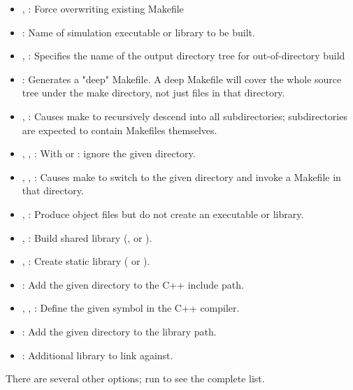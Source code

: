 \begin{itemize}
    \item {},  : Force overwriting existing Makefile
    \item {} : Name of simulation executable or library to be built.
    \item {},  :
                          Specifies the name of the output directory tree for out-of-directory build
    \item {} : Generates a "deep" Makefile. A deep Makefile will
                          cover the whole source tree under the make directory,
                          not just files in that directory.
    \item {},  : Causes make to recursively descend into all subdirectories;
                          subdirectories are expected to contain Makefiles themselves.
    \item {}, ,  :
                          With  or : ignore the given directory.
    \item {}, ,  :
                          Causes make to switch to the given directory and invoke
                          a Makefile in that directory.
    \item {},  : Produce object files but do not create an executable or library.
    \item {},  : Build shared library (,  or ).
    \item {},  : Create static library ( or ).
    \item {} : Add the given directory to the C++ include path.
    \item {}, ,  : 
                          Define the given symbol in the C++ compiler.
    \item {} : Add the given directory to the library path.
    \item {} : Additional library to link against.
\end{itemize}

There are several other options; run  to see the complete
list.


